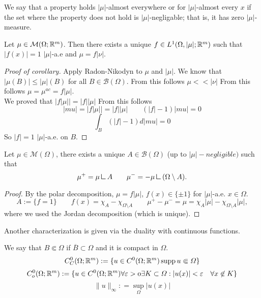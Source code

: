 \begin{definition} We say that a property holds $|\mu|$-almost everywhere or for
$|\mu|$-almost every $x$ if the set where the property does not hold is
$|\mu|$-negligable; that is, it has zero $|\mu|$-measure.
\end{definition}

\begin{corollary}
Let $\mu \in \mathcal{M}(\Omega;\mathbb{R}^m)$. Then there exists a unique $f \in
L^1(\Omega,|\mu|;\mathbb{R}^m)$ such that $|f(x)| =1 $ $|\mu|$-a.e and $\mu = f|\nu|$.
\end{corollary}

\begin{proof}[Proof of corollary]
Apply Radon-Nikodyn to $\mu$ and $|\mu|$. We know that 
\(
|\mu(B)| \leq |\mu|(B) 
\)
for all $B \in \mathcal{B}(\Omega)$. From this follows $\mu << |\nu|$ From this
follows $\mu = \mu^{ac} = f|\mu|$.
\\
We proved that  $|f|\mu|| = |f||\mu|$ From this follows
\[
|mu| = |f|\mu|| = |f||\mu|
\qquad 
(|f| - 1)|mu| = 0
\]
\[
\int_B(|f| - 1)d|mu| = 0
\]
So $|f| =1$ $|\mu|$-a.e. on $B$.
\end{proof}

\begin{corollary}
Let $\mu \in \mathcal{M}(\Omega)$, there exists a unique $A \in
\mathcal{B}(\Omega)$ (up to $|\mu|-negligible)$ such that 
\[
\mu^+ = \mu \mres A
\qquad 
\mu^- = -\mu \mres (\Omega \setminus A).
\]
\end{corollary}
\begin{proof}
By the polar decomposition, $\mu = f|\mu|$, $f(x) \in \{\pm 1\}$ for
$|\mu|$-a.e. $x\in\Omega$.
\[
A:= \{f =1 \} 
\qquad 
f(x) = \chi_A - \chi_{\Omega\setminus A}
\qquad
\mu^+ - \mu^- = \mu = \chi_A |\mu| - \chi_{\Omega\setminus A} |\mu|,
\]
where we used the Jordan decomposition (which is unique).
\end{proof}

Another characterization is given via the duality with continuous functions.

\begin{definition}
We say that $B \Subset \Omega$ if $\overline{B} \subset \Omega$ and it is
compact in $\Omega$.
\[
C^0_C(\Omega; \mathbb{R}^m) := \{u \in C^0(\Omega;\mathbb{R}^m) \mit \operatorname{supp} u \Subset \Omega \}
\]
\[
C^0_o(\Omega; \mathbb{R}^m) := \{u \in C^0(\Omega;\mathbb{R}^m) \mit \forall \varepsilon > 0
\exists K \subset \Omega: |u(x)| < \varepsilon \quad \forall x \not\in K 
\}
\]
\[
\|u\|_{\infty} : = \sup_{\Omega} |u(x)|
\]
\end{definition}

